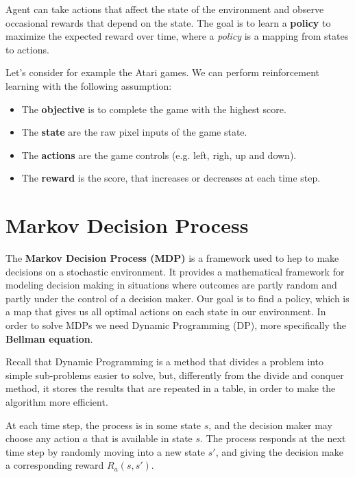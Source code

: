 Agent can take actions that affect the state of the environment and observe occasional rewards that depend on the state. The goal is to learn a \textbf{policy} to maximize the expected reward over time, where a \emph{policy} is a mapping from states to actions.

\begin{example}
    Let's consider for example the Atari games. We can perform reinforcement learning with the following assumption:
    \begin{itemize}[topsep={0pt}, partopsep={0pt}]
        \itemsep0pt
        \item The \textbf{objective} is to complete the game with the highest score.
        \item The \textbf{state} are the raw pixel inputs of the game state.
        \item The \textbf{actions} are the game controls (e.g. left, righ, up and down).
        \item The \textbf{reward} is the score, that increases or decreases at each time step.
    \end{itemize}
\end{example}

\section{Markov Decision Process}
The \textbf{Markov Decision Process (MDP)} is a framework used to hep to make decisions on a stochastic environment. It provides a mathematical framework for modeling decision making in situations where outcomes are partly random and partly under the control of a decision maker. Our goal is to find a policy, which is a map that gives us all optimal actions on each state in our environment. In order to solve MDPs we need Dynamic Programming (DP), more specifically the \textbf{Bellman equation}. 

Recall that Dynamic Programming is a method that divides a problem into simple sub-problems easier to solve, but, differently from the divide and conquer method, it stores the results that are repeated in a table, in order to make the algorithm more efficient.

At each time step, the process is in some state \(s\), and the decision maker may choose any action \(a\) that is available in state \(s\). The process responds at the next time step by randomly moving into a new state \(s'\), and giving the decision make a corresponding reward \(R_a(s,s')\).

